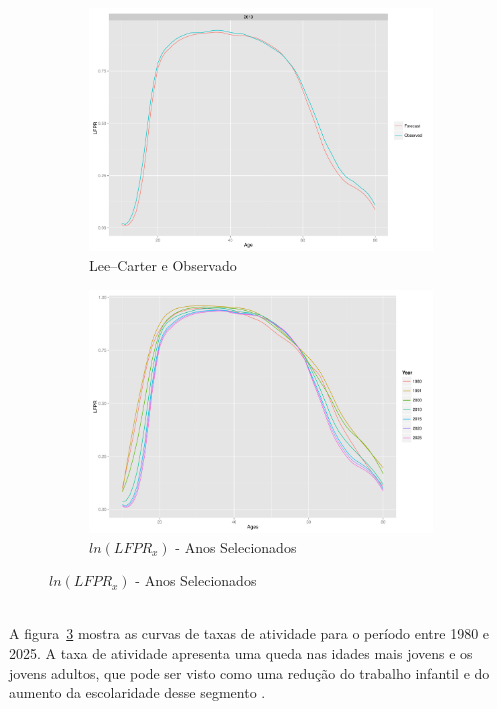 \documentclass[12pt, 						%
			openright, 					%
			twoside,					%
			a4paper,x					%
			english,					%
			brazil]{abntex2}				%
\begin{document}
	\begin{figure}[!htb]
	\caption{\label{fig7} Validação do Modelo e Taxas projetadas}
		\begin{subfigure}[b]{0.5\textwidth}
		\begin{center}
			\caption{\label{fig7.1} Lee--Carter e Observado}
			\includegraphics[width=\textwidth]{Graphs/LFPR_validation.pdf}
		\end{center}
		\end{subfigure}
	\hfill
		\begin{subfigure}[b]{0.5\textwidth}
		\begin{center}
			\caption{\label{fig7.2} $ln(LFPR_{x})$ - Anos Selecionados}
			\includegraphics[width=\textwidth]{Graphs/LFPR_select.pdf}
		\end{center}
 		\end{subfigure}
	\end{figure} \\
	A figura~\ref{fig7.2} mostra as curvas de taxas de atividade para o período entre 1980 e 2025. A taxa de atividade apresenta uma queda nas idades mais jovens e os jovens adultos, que pode ser visto como uma redução do trabalho infantil e do aumento da escolaridade desse segmento \cite{chahad2013mercado}.
\end{document}
